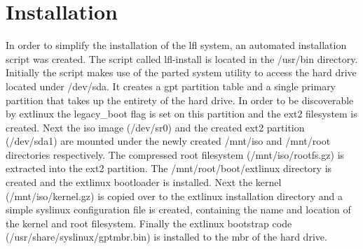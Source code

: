 \section{Installation}\label{Installation}

In order to simplify the installation of the \gls{lfl} system, an automated installation script was created. The script called lfl-install is located in the /usr/bin directory. Initially the script makes use of the parted system utility to access the hard drive located under /dev/sda. It creates a \gls{gpt} partition table and a single primary partition that takes up the entirety of the hard drive. In order to be discoverable by extlinux the legacy\_boot flag is set on this partition and the ext2 filesystem is created. Next the \gls{iso} image (/dev/sr0) and the created ext2 partition (/dev/sda1) are mounted under the newly created /mnt/iso and /mnt/root directories respectively. The compressed root filesystem (/mnt/iso/rootfs.gz) is extracted into the ext2 partition. The /mnt/root/boot/extlinux directory is created and the extlinux bootloader is installed. Next the kernel (/mnt/iso/kernel.gz) is copied over to the extlinux installation directory and a simple syslinux configuration file is created, containing the name and location of the kernel and root filesystem. Finally the extlinux bootstrap code (/usr/share/syslinux/gptmbr.bin) is installed to the \gls{mbr} of the hard drive.
